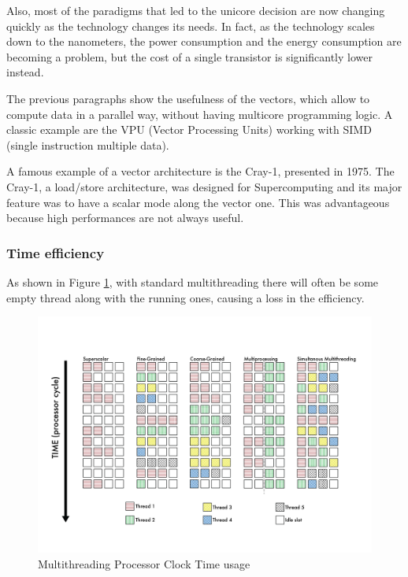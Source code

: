 Also, most of the paradigms that led to the unicore decision are now changing quickly as the technology changes its needs.
In fact, as the technology scales down to the nanometers, the power consumption and the energy consumption are becoming a problem, but the cost of a single transistor is significantly lower instead.


The previous paragraphs show the usefulness of the vectors, which allow to compute data in a parallel way, without having multicore programming logic.
A classic example are the VPU (Vector Processing Units) working with SIMD (single instruction multiple data).

A famous example of a vector architecture is the Cray-1, presented in 1975.
The Cray-1, a load/store architecture, was designed for Supercomputing and its major feature was to have a scalar mode along the vector one. This was advantageous because high performances are not always useful.

\subsubsection{Time efficiency}
As shown in Figure \ref{Multithreading}, with standard multithreading there will often be some empty thread along with the running ones, causing a loss in the efficiency.
\begin{figure}[H]
    \centering
    \includegraphics[scale = 0.5]{Chapter_1/img/threads.png}
    \caption{Multithreading Processor Clock Time usage  \cite{L15-Krste}}
    \label{Multithreading}
\end{figure}

